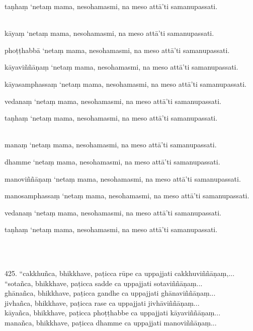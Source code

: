 \documentclass[9pt]{article}
\begin{document}
{{taṇhaṃ ‘netaṃ mama, nesohamasmi, na meso attā’ti samanupassati.\\\

kāyaṃ ‘netaṃ mama, nesohamasmi, na meso attā’ti samanupassati.\

phoṭṭhabbā ‘netaṃ mama, nesohamasmi, na meso attā’ti samanupassati.\

kāyaviññāṇaṃ ‘netaṃ mama, nesohamasmi, na meso attā’ti samanupassati.\

kāyasamphassaṃ ‘netaṃ mama, nesohamasmi, na meso attā’ti samanupassati.\

vedanaṃ ‘netaṃ mama, nesohamasmi, na meso attā’ti samanupassati.\

taṇhaṃ ‘netaṃ mama, nesohamasmi, na meso attā’ti samanupassati.\\\

manaṃ ‘netaṃ mama, nesohamasmi, na meso attā’ti samanupassati.\

dhamme ‘netaṃ mama, nesohamasmi, na meso attā’ti samanupassati.\

manoviññāṇaṃ ‘netaṃ mama, nesohamasmi, na meso attā’ti samanupassati.\

manosamphassaṃ ‘netaṃ mama, nesohamasmi, na meso attā’ti samanupassati.\

vedanaṃ ‘netaṃ mama, nesohamasmi, na meso attā’ti samanupassati.\

taṇhaṃ ‘netaṃ mama, nesohamasmi, na meso attā’ti samanupassati.}}\\\


425. “cakkhuñca, bhikkhave, paṭicca rūpe ca uppajjati cakkhuviññāṇaṃ,...\\

“sotañca, bhikkhave, paṭicca sadde ca uppajjati sotaviññāṇaṃ...\\

ghānañca, bhikkhave, paṭicca gandhe ca uppajjati ghānaviññāṇaṃ...\\

jivhañca, bhikkhave, paṭicca rase ca uppajjati jivhāviññāṇaṃ...\\

kāyañca, bhikkhave, paṭicca phoṭṭhabbe ca uppajjati kāyaviññāṇaṃ...\\

manañca, bhikkhave, paṭicca dhamme ca uppajjati manoviññāṇaṃ...\\\
\end{document}
